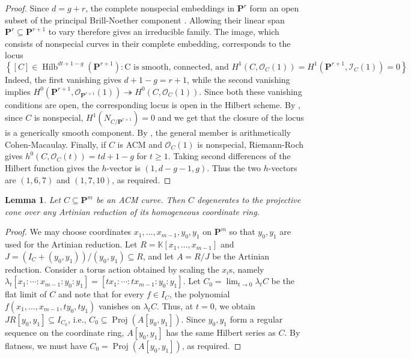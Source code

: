 \documentclass[leqno,11pt,a4paper]{amsart}
\newtheorem{lemma}[lemma]{Lemma}
\theoremstyle{definition}
\numberwithin{equation}{section}
\newcommand{\kk}{\mathbb{K}}
\newcommand{\PP}{\mathbf{P}}
\newcommand{\OO}{\mathscr{O}}
\newcommand{\II}{\mathscr{I}}
\DeclareMathOperator{\Hilb}{Hilb}
\DeclareMathOperator{\Proj}{Proj}
\begin{document}
\begin{proof}
Since $d=g+r$, the complete nonspecial embeddings in $\PP^r$ form an open subset of the principal Brill-Noether component \cite[Theorems~19.5 and~19.9]{EH24}. 
Allowing their linear span $\PP^r\subseteq\PP^{r+1}$ to vary therefore gives an irreducible family. 
The image, which consists of nonspecial curves in their complete embedding, corresponds to the locus 
$$
\left\{[C] \in \Hilb^{dt+1-g}(\PP^{r+1}): \text{C is smooth, connected, and } H^1(C,\OO_C(1))= H^1(\PP^{r+1},\II_C(1))=0 \right\}
$$
Indeed, the first vanishing gives $d+1-g=r+1$, while the second vanishing implies $H^0(\PP^{r+1},\OO_{\PP^{r+1}}(1)) \twoheadrightarrow H^0(C,\OO_C(1))$. 
Since both these vanishing conditions are open, the corresponding locus is open in the Hilbert scheme.
By \cite[Theorem 19.5]{EH24}, since $C$ is nonspecial, $H^1(N_{C/\PP^{r+1}})=0$ and we get that the closure of the locus is a generically smooth component. 
By \cite[Corollary 9.2(3)]{eisenbud:syzygies}, the general member is arithmetically Cohen-Macaulay.
Finally, if $C$ is ACM and $\OO_C(1)$ is nonspecial, Riemann-Roch gives $h^0(C,\OO_C(t)) =td+1-g$ for $t \geq 1$. 
Taking second differences of the Hilbert function gives the $h$-vector is $(1,d-g-1,g)$.
Thus the two $h$-vectors are $(1,6,7)$ and $(1,7,10)$, as required.
\end{proof}

\begin{lemma} \label{artinian_reduction}
Let $C\subseteq\PP^m$ be an ACM curve. 
Then $C$ degenerates to the projective cone over any Artinian reduction of its homogeneous coordinate ring.
\end{lemma}
\begin{proof}
We may choose  coordinates $x_1,\ldots,x_{m-1},y_0,y_1$ on  $\PP^m$ so that $y_0,y_1$ are used for the Artinian reduction. 
Let $R = \kk[x_1,\dots,x_{m-1}]$ and $J = (I_C + (y_0,y_1))/(y_0,y_1) \subseteq R$, and let $A = R/J$ be the Artinian reduction.
Consider a torus action obtained by scaling the $x_i$s, namely  $\lambda_t[x_1:\cdots:x_{m-1}:y_0:y_1] = [tx_1:\cdots:tx_{m-1}:y_0:y_1]$.
Let $C_0 = \lim_{t \to 0} \lambda_tC$ be the flat limit of $C$ and note that for every $f\in I_C$, the polynomial $f(x_1,\ldots,x_{m-1},ty_0,ty_1)$ vanishes on $\lambda_tC$.
Thus, at $t=0$, we obtain  $JR[y_0,y_1]\subseteq I_{C_0}$, i.e., $C_0\subseteq\operatorname{Proj}(A[y_0,y_1])$.
Since $y_0,y_1$ form a regular sequence on the coordinate ring, $A[y_0,y_1]$ has the same Hilbert series as $C$. 
By flatness, we must have $C_0 = \Proj(A[y_0,y_1])$, as required.
\end{proof}
\end{document}
